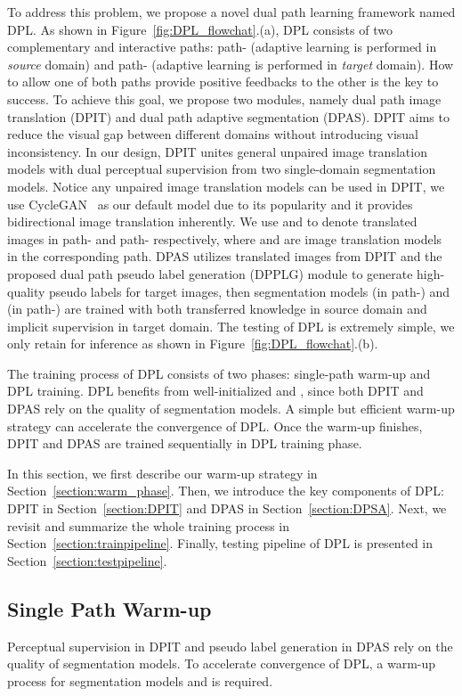 \documentclass[10pt,twocolumn,letterpaper]{article}
\begin{document}
To address this problem, we propose a novel dual path learning framework named DPL. As shown in Figure~\ref{fig:DPL_flowchat}.(a), DPL consists of two complementary and interactive paths: path- (adaptive learning is performed in \emph{source} domain) and path- (adaptive learning is performed in \emph{target} domain). How to allow one of both paths provide positive feedbacks to the other is the key to success. To achieve this goal, we propose two modules, namely dual path image translation (DPIT) and dual path adaptive segmentation (DPAS). DPIT aims to reduce the visual gap between different domains without introducing visual inconsistency. In our design, DPIT unites general unpaired image translation models with dual perceptual supervision from two single-domain segmentation models. Notice any unpaired image translation models can be used in DPIT, we use CycleGAN~\cite{CycleGAN2017} as our default model due to its popularity and it provides bidirectional image translation inherently. We use
 and  to denote translated images in path- and path- respectively, where  and  are image translation models in the corresponding path. DPAS utilizes translated images from DPIT and the proposed dual path pseudo label generation (DPPLG) module to generate high-quality pseudo labels for target images, then segmentation models  (in path-) and  (in path-) are trained with both transferred knowledge in source domain and implicit supervision in target domain. The testing of DPL is extremely simple, we only retain  for inference as shown in Figure~\ref{fig:DPL_flowchat}.(b).

The training process of DPL consists of two phases: single-path warm-up and DPL training. DPL benefits from well-initialized  and , since both DPIT and DPAS rely on the quality of segmentation models. A simple but efficient warm-up strategy can accelerate the convergence of DPL. Once the warm-up finishes, DPIT and DPAS are trained sequentially in DPL training phase. 

In this section, we first describe our warm-up strategy in Section~\ref{section:warm_phase}. Then, we introduce the key components of DPL: DPIT in Section~\ref{section:DPIT} and DPAS in Section~\ref{section:DPSA}. Next, we revisit and summarize the whole training process in Section~\ref{section:trainpipeline}. Finally, testing pipeline of DPL is presented in Section~\ref{section:testpipeline}.

\subsection{Single Path Warm-up\label{section:warm_phase}}
Perceptual supervision in DPIT and pseudo label generation in DPAS rely on the quality of segmentation models. To accelerate convergence of DPL, a warm-up process for segmentation models  and  is required. 
\end{document}

